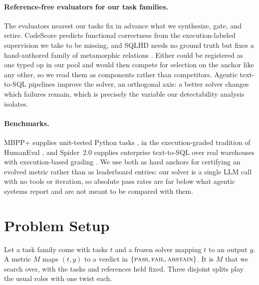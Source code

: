 \documentclass[letterpaper]{article} %
\begin{document}
\paragraph{Reference-free evaluators for our task families.}
The evaluators nearest our tasks fix in advance what we synthesize, gate, and retire. CodeScore \citep{dong2024codescore} predicts functional correctness from the execution-labeled supervision we take to be missing, and SQLHD \citep{yang2025sqlhd} needs no ground truth but fixes a hand-authored family of metamorphic relations \citep{chen1998metamorphic}. Either could be registered as one typed op in our pool and would then compete for selection on the anchor like any other, so we read them as components rather than competitors. Agentic text-to-SQL pipelines \citep{deng2025reforce} improve the solver, an orthogonal axis: a better solver changes which failures remain, which is precisely the variable our detectability analysis isolates.

\paragraph{Benchmarks.}
MBPP+ supplies unit-tested Python tasks \citep{austin2021mbpp,liu2023evalplus}, in the execution-graded tradition of HumanEval \citep{chen2021codex}, and Spider~2.0 supplies enterprise text-to-SQL over real warehouses with execution-based grading \citep{lei2025spider2}. We use both as hard anchors for certifying an evolved metric rather than as leaderboard entries: our solver is a single LLM call with no tools or iteration, so absolute pass rates are far below what agentic systems report and are not meant to be compared with them.

\section{Problem Setup}

Let a task family come with tasks $t$ and a frozen solver mapping $t$ to an output $y$. A metric $M$ maps $(t, y)$ to a verdict in $\{\textsc{pass}, \textsc{fail}, \textsc{abstain}\}$. It is $M$ that we search over, with the tasks and references held fixed. Three disjoint splits play the usual roles with one twist each.
\end{document}
